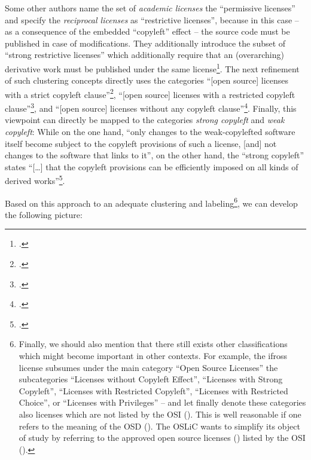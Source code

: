 Some other authors name the set of \emph{academic licenses} the
\enquote{permissive licenses} and specify the \emph{reciprocal licenses} as
\enquote{restrictive licenses}, because in this case -- as a consequence of the
embedded \enquote{copyleft} effect -- the source code must be published in case
of modifications. They additionally introduce the subset of \enquote{strong
restrictive licenses} which additionally require that an (overarching)
derivative work must be published under the same license\footcite[pars pro toto
cf.][57]{Buchtala2007a}. The next refinement of such clustering concepts
directly uses the categories \enquote{[open source] licenses with a strict
copyleft clause}\footcite[Originally stated as \enquote{Lizenzen mit einer
strengen Copyleft-Klausel}. Cf.][24]{JaeMet2011a}, \enquote{[open source]
licenses with a restricted copyleft clause}\footcite[Originally stated as
\enquote{Lizenzen mit einer beschränkten Copyleft-Klausel}.
Cf.][71]{JaeMet2011a}, and \enquote{[open source] licenses without any copyleft
clause}\footcite[Originally stated as \enquote{Lizenzen ohne Copyleft-Klausel}.
Cf.][83]{JaeMet2011a}. Finally, this viewpoint can directly be mapped to the
categories \emph{strong copyleft} and \emph{weak copyleft}: While on the one
hand, \enquote{only changes to the weak-copylefted software itself become
subject to the copyleft provisions of such a license, [and] not changes to the
software that links to it}, on the other hand, the \enquote{strong copyleft}
states \enquote{[\ldots] that the copyleft provisions can be efficiently imposed
on all kinds of derived works}\footcite[cf.][\nopage wp]{wpCopyleft2013a}.

Based on this approach to an adequate clustering and labeling\footnote{Finally,
we should also mention that there still exists other classifications which might
become important in other contexts. For example, the ifross license subsumes
under the main category \enquote{Open Source Licenses} the subcategories
\enquote{Licenses without Copyleft Effect}, \enquote{Licenses with Strong
Copyleft}, \enquote{Licenses with Restricted Copyleft}, \enquote{Licenses with
Restricted Choice}, or \enquote{Licenses with Privileges} -- and let finally
denote these categories also licenses which are not listed by the OSI
(\cite[cf.][\nopage wp]{ifross2011a}). This is well reasonable if one refers to
the meaning of the OSD (\cite[cf.][\nopage wp]{OSI2012a}). The OSLiC wants to
simplify its object of study by referring to the approved open source licenses
(\cite[cf.][\nopage wp]{OSI2012d}) listed by the OSI (\cite[cf.][\nopage
wp]{OSI2012b}).}, we can develop the following picture:

